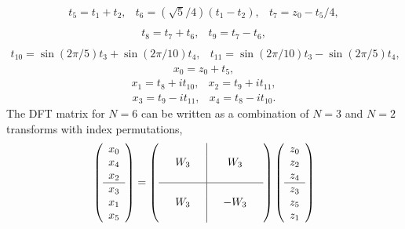 \documentclass[fleqn,12pt]{article}
\begin{document}
\begin{equation}
\begin{array}{llll}
t_5 = t_1 + t_2, &
t_6 = (\sqrt{5}/4) (t_1 - t_2), &
t_7 = z_0 - t_5/4, \\
\end{array}
\end{equation}
\begin{equation}
\begin{array}{llll}
t_8 = t_7 + t_6, &
t_9 = t_7 - t_6, \\
\end{array}
\end{equation}
\begin{equation}
\begin{array}{llll}
t_{10} = \sin(2\pi/5) t_3 + \sin(2\pi/10) t_4, &
t_{11} = \sin(2\pi/10) t_3 - \sin(2\pi/5) t_4,
\end{array}
\end{equation}
\begin{equation}
\begin{array}{llll}
x_0 = z_0 + t_5,
\end{array}
\end{equation}
\begin{equation}
\begin{array}{llll}
x_1 = t_8 + i t_{10}, &
x_2 = t_9 + i t_{11},
\end{array}
\end{equation}
\begin{equation}
\begin{array}{llll}
x_3 = t_9 - i t_{11}, &
x_4 = t_8 - i t_{10}.
\end{array}
\end{equation}
%
The DFT matrix for $N=6$ can be written as a combination of $N=3$ and
$N=2$ transforms with index permutations,
%
\begin{equation}
\left(
\begin{array}{c}
x_0 \\
x_4 \\
x_2 \\
\hline x_3 \\
x_1 \\
x_5
\end{array}
\right)
= 
\left(
\begin{array}{ccc|ccc}
  &   &  &  &   & \\
  &W_3&  &  &W_3& \\
  &   &  &  &   & \\
\hline  &   &  &  &   & \\
  &W_3&  &  &-W_3& \\
  &   &  &  &   & 
\end{array}
\right)
\left(
\begin{array}{c}
z_0 \\
z_2 \\
z_4 \\
\hline z_3 \\
z_5 \\
z_1 
\end{array}
\right)
\end{equation}
\end{document}
